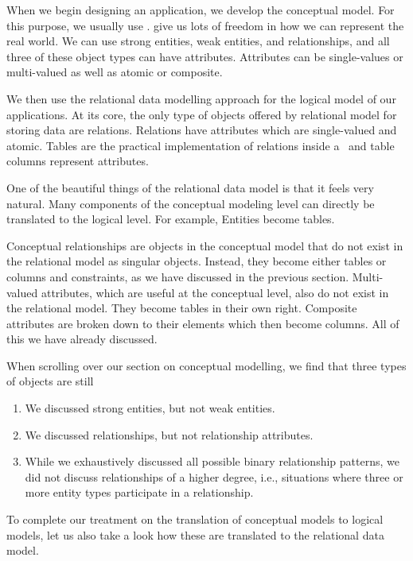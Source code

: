 %
%
When we begin designing an application, we develop the conceptual model.
For this purpose, we usually use .
 give us lots of freedom in how we can represent the real world.
We can use strong entities, weak entities, and relationships, and all three of these object types can have attributes.
Attributes can be single-values or multi-valued as well as atomic or composite.

We then use the relational data modelling approach for the logical model of our applications.
At its core, the only type of objects offered by relational model for storing data are relations.
Relations have attributes which are single-valued and atomic.
Tables are the practical implementation of relations inside a \dbms\ and table columns represent attributes.

One of the beautiful things of the relational data model is that it feels very natural.
Many components of the conceptual modeling level can directly be translated to the logical level.
For example, Entities become tables.

Conceptual relationships are objects in the conceptual model that do not exist in the relational model as singular objects.
Instead, they become either tables or columns and constraints, as we have discussed in the previous section.
Multi-valued attributes, which are useful at the conceptual level, also do not exist in the relational model.
They become tables in their own right.
Composite attributes are broken down to their elements which then become columns.
All of this we have already discussed.

When scrolling over our section on conceptual modelling, we find that three types of objects are still %
%
\begin{enumerate}%
%
\item We discussed strong entities, but not weak entities.%
%
\item We discussed relationships, but not relationship attributes.%
%
\item While we exhaustively discussed all possible binary relationship patterns, we did not discuss relationships of a higher degree, i.e., situations where three or more entity types participate in a relationship.%
%
\end{enumerate}%
%
To complete our treatment on the translation of conceptual models to logical models, let us also take a look how these are translated to the relational data model.%
%
\FloatBarrier%
%
%
%
\endhsection%
%
